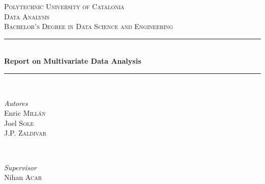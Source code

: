 \begin{titlepage} %
	\newcommand{\HRule}{\rule{\linewidth}{0.5mm}} %
	
	\center %
	
	
	\textsc{\LARGE Polytechnic University of Catalonia}\\[1.5cm] %
	
	\textsc{\Large Data Analysis}\\[0.5cm] %
	
	\textsc{\large Bachelor's Degree in Data Science and Engineering}\\[0.5cm] %
	
	
	\HRule\\[0.4cm]
	
	{\huge\bfseries Report on Multivariate Data Analysis}\\[0.4cm] %
	
	\HRule\\[1.5cm]
	
	
	\begin{minipage}{0.4\textwidth}
		\begin{flushleft}
			\large
			\textit{Autores}\\
			Enric \textsc{Millán} \\
                Joel \textsc{Sole} \\
                J.P. \textsc{Zaldivar}%
		\end{flushleft}
	\end{minipage}
	~
	\begin{minipage}{0.4\textwidth}
		\begin{flushright}
			\large
			\textit{Supervisor}\\
			  Nihan \textsc{Acar} %
		\end{flushright}
	\end{minipage}


\end{titlepage}

